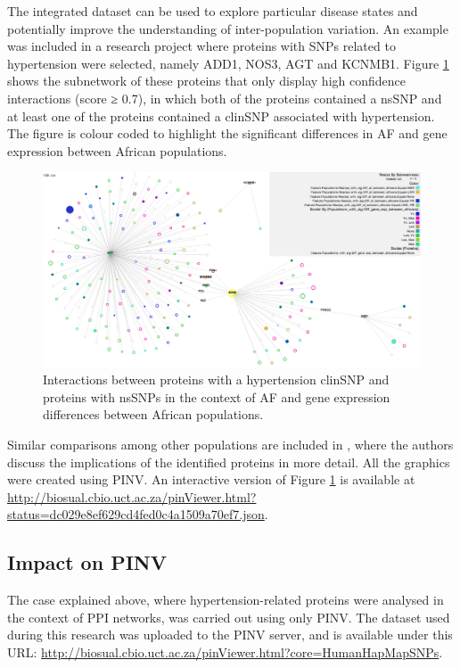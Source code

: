 The integrated dataset can be used to explore particular disease states and potentially improve the understanding of inter-population variation. An example was included in a research project where proteins with SNPs related to hypertension were selected, namely ADD1, NOS3, AGT and KCNMB1. Figure \ref{fig:pinv_human_snps} shows the subnetwork of these proteins that only display high confidence interactions (score ≥ 0.7), in which both of the proteins contained a nsSNP and at least one of the proteins contained a clinSNP  associated with hypertension. The figure is colour coded to highlight the significant differences in AF and gene expression between African populations. 

\begin{figure}
\centering
\includegraphics[width=\textwidth]{figures/pinv_human_snps.png}
\caption[Interactions between proteins with a hypertension clinSNP]{Interactions between proteins with a hypertension clinSNP and proteins with nsSNPs in the context of AF and gene expression differences between African populations.
\label{fig:pinv_human_snps}}
\end{figure}

Similar comparisons among other populations are included in \cite{HEE2014}, where the authors discuss the implications of the identified proteins in more detail. All the graphics were created using PINV. An interactive version of Figure \ref{fig:pinv_human_snps} is available at \url{http://biosual.cbio.uct.ac.za/pinViewer.html?status=dc029e8ef629cd4fed0c4a1509a70ef7.json}.

\subsection{Impact on PINV}
The case explained above, where hypertension-related proteins were analysed in the context of PPI networks, was carried out using only PINV. The dataset used during this research was uploaded to the PINV server, and is available under this URL: \url{http://biosual.cbio.uct.ac.za/pinViewer.html?core=HumanHapMapSNPs}. 

